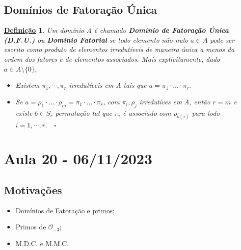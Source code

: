 \documentclass{article}
\newtheorem*{def*}{\underline{Defini\c c\~ao}}
\begin{document}
\subsection{Domínios de Fatoração Única}
\begin{def*}
  Um domínio A é chamado \textbf{Domínio de Fatoração Única (D.F.U.)} ou \textbf{Domínio Fatorial} se 
todo elemento não nulo \(a\in A\) pode ser escrito como produto de elementos irredutíveis de maneira única a menos 
da ordem dos fatores e de elementos associados. Mais explicitamente, dado \(a\in A\setminus{\{0\}},\)
\begin{itemize}
  \item[1)] Existem \(\pi_{1}, \cdots, \pi_{r}\) irredutíveis em A tais que \(a = \pi_{1}\cdot \dotsc \cdot \pi_{r}.\)
  \item[2)] Se \(a = \rho_{1}\cdot\dotsc \cdot \rho_{m} = \pi_{1}\cdot \dotsc \cdot \pi_{r}\), com \(\pi_{i}, \rho_{j}\) irredutíves em A, então \(r = m\)
e existe \(b\in S_{r}\) permutação tal que \(\pi_{i}\) é associado com \(\rho_{b(i)}\) para todo \(i=1, \cdots, r. \quad\square\)
\end{itemize}
\end{def*}
\newpage

\section{Aula 20 - 06/11/2023}
\subsection{Motivações}
\begin{itemize}
  \item Domínios de Fatoração e primos;
  \item Primos de \(\mathcal{O}_{-3}\);
  \item M.D.C. e M.M.C.
\end{itemize}
\end{document}
